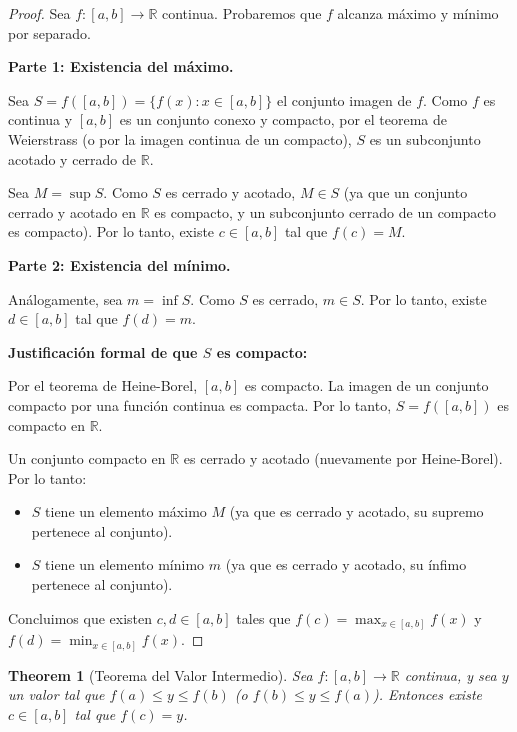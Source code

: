 \documentclass[11pt,a4paper]{article}
\theoremstyle{plain}
\newtheorem{theorem}{Theorem}[section]
\theoremstyle{definition}
\begin{document}
\begin{proof}
Sea $f: [a, b] \to \mathbb{R}$ continua. Probaremos que $f$ alcanza máximo y mínimo por separado.

\textbf{Parte 1: Existencia del máximo.}

Sea $S = f([a, b]) = \{f(x) : x \in [a, b]\}$ el conjunto imagen de $f$. Como $f$ es continua y $[a, b]$ es un conjunto conexo y compacto, por el teorema de Weierstrass (o por la imagen continua de un compacto), $S$ es un subconjunto acotado y cerrado de $\mathbb{R}$.

Sea $M = \sup S$. Como $S$ es cerrado y acotado, $M \in S$ (ya que un conjunto cerrado y acotado en $\mathbb{R}$ es compacto, y un subconjunto cerrado de un compacto es compacto). Por lo tanto, existe $c \in [a, b]$ tal que $f(c) = M$.

\textbf{Parte 2: Existencia del mínimo.}

Análogamente, sea $m = \inf S$. Como $S$ es cerrado, $m \in S$. Por lo tanto, existe $d \in [a, b]$ tal que $f(d) = m$.

\textbf{Justificación formal de que $S$ es compacto:}

Por el teorema de Heine-Borel, $[a, b]$ es compacto. La imagen de un conjunto compacto por una función continua es compacta. Por lo tanto, $S = f([a, b])$ es compacto en $\mathbb{R}$.

Un conjunto compacto en $\mathbb{R}$ es cerrado y acotado (nuevamente por Heine-Borel). Por lo tanto:
\begin{itemize}
    \item $S$ tiene un elemento máximo $M$ (ya que es cerrado y acotado, su supremo pertenece al conjunto).
    \item $S$ tiene un elemento mínimo $m$ (ya que es cerrado y acotado, su ínfimo pertenece al conjunto).
\end{itemize}

Concluimos que existen $c, d \in [a, b]$ tales que $f(c) = \max_{x \in [a,b]} f(x)$ y $f(d) = \min_{x \in [a,b]} f(x)$.
\end{proof}

\begin{theorem}[Teorema del Valor Intermedio]
Sea $f: [a, b] \to \mathbb{R}$ continua, y sea $y$ un valor tal que $f(a) \leq y \leq f(b)$ (o $f(b) \leq y \leq f(a)$). Entonces existe $c \in [a, b]$ tal que $f(c) = y$.
\end{theorem}
\end{document}
